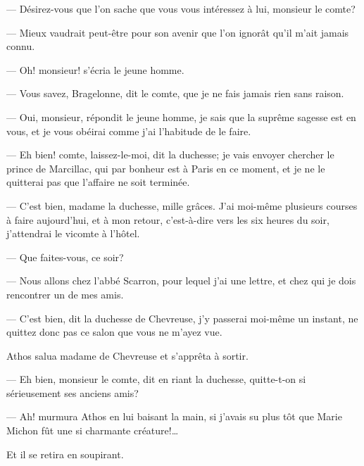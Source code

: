 — Désirez-vous que l'on sache que vous vous intéressez à lui, monsieur le comte?

— Mieux vaudrait peut-être pour son avenir que l'on ignorât qu'il m'ait jamais connu.

— Oh! monsieur! s'écria le jeune homme.

— Vous savez, Bragelonne, dit le comte, que je ne fais jamais rien sans raison.

— Oui, monsieur, répondit le jeune homme, je sais que la suprême sagesse est en vous, et je vous obéirai comme j'ai l'habitude de le faire.

— Eh bien! comte, laissez-le-moi, dit la duchesse; je vais envoyer chercher le prince de Marcillac, qui par bonheur est à Paris en ce moment, et je ne le quitterai pas que l'affaire ne soit terminée.

— C'est bien, madame la duchesse, mille grâces. J'ai moi-même plusieurs courses à faire aujourd'hui, et à mon retour, c'est-à-dire vers les six heures du soir, j'attendrai le vicomte à l'hôtel.

— Que faites-vous, ce soir?

— Nous allons chez l'abbé Scarron, pour lequel j'ai une lettre, et chez qui je dois rencontrer un de mes amis.

— C'est bien, dit la duchesse de Chevreuse, j'y passerai moi-même un instant, ne quittez donc pas ce salon que vous ne m'ayez vue.

Athos salua madame de Chevreuse et s'apprêta à sortir.

— Eh bien, monsieur le comte, dit en riant la duchesse, quitte-t-on si sérieusement ses anciens amis?

— Ah! murmura Athos en lui baisant la main, si j'avais su plus tôt que Marie Michon fût une si charmante créature!\dots

Et il se retira en soupirant.